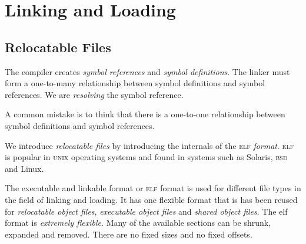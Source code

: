 
\chapter{Linking and Loading}


\section{Relocatable Files}


The compiler creates \textit{symbol references} and \textit{symbol definitions}.
The linker must form a one-to-many relationship between symbol definitions 
and symbol references. We are \textit{resolving} the symbol reference.


A common mistake is to think that there is a one-to-one relationship between 
symbol definitions and symbol references. 

\frmrule

We introduce \textit{relocatable files} 
by introducing the internals of the \textsc{elf} \textit{format}.
\textsc{elf} is popular in \textsc{unix} operating systems and 
found in systems such as Solaris, \textsc{bsd} and Linux.


The executable and linkable format or \textsc{elf} format is used for 
different file types in the field of linking and loading. 
It has one flexible format that is has been reused for \textit{relocatable 
object files}, \textit{executable object files} and \textit{shared object files}. 
The elf format is \textit{extremely flexible}. Many of the available sections can be shrunk, 
expanded and removed. There are no fixed sizes and no fixed offsets. 




\begin{figure}[h]
\end{figure}

